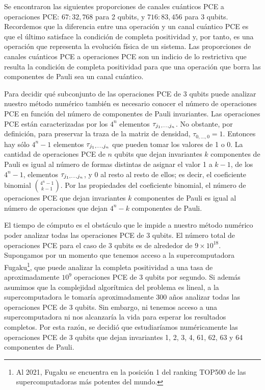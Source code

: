 Se encontraron las siguientes proporciones de canales cuánticos PCE a 
operaciones PCE: $67:32,768$ para 2 qubits, y $716:83,456$ para 
3 qubits. Recordemos que la diferencia entre una operación y un canal cuántico PCE
es que el último satisface la condición de completa positividad y, por tanto, 
es una operación que representa la evolución física de un sistema. 
Las proporciones de canales cuánticos PCE a operaciones PCE son un indicio 
de lo restrictiva que resulta la condición de completa positividad para que 
una operación que borra las componentes de Pauli sea un canal cuántico.

Para decidir qué subconjunto de las operaciones PCE de 3 qubits puede analizar
nuestro método numérico también es necesario conocer el número 
de operaciones PCE en función del número de componentes 
de Pauli invariantes. Las operaciones PCE están caracterizadas 
por los $4^n$ elementos $\tau_{j_1,\ldots ,j_n}$. No obstante, por definición, 
para preservar la traza de la matriz de densidad, $\tau_{0,\ldots,0}=1$.
Entonces hay sólo $4^n-1$ elementos $\tau_{j_1,\ldots ,j_n}$ que pueden tomar los valores de 1 o 0.
La cantidad de operaciones PCE de $n$ qubits que dejan invariantes $k$ componentes 
de Pauli es igual al número de formas distintas de asignar el valor 1
a $k-1$, de los $4^n-1$, elementos $\tau_{j_1,\ldots ,j_n}$, y 0 al resto al resto de ellos; 
es decir, el coeficiente binomial $\binom{4^n-1}{k-1}$. Por las propiedades
del coeficiente binomial, el número de operaciones PCE que dejan invariantes 
$k$ componentes de Pauli es igual al número de operaciones que dejan $4^n-k$
componentes de Pauli. 

El tiempo de cómputo es el obstáculo que le impide a nuestro método numérico
poder analizar todas las operaciones PCE de 3 qubits. 
El número total de operaciones PCE para el caso 
de 3 qubits es de alrededor de $9\times10^{18}$. Supongamos por un momento
que tenemos acceso a la supercomputadora Fugaku\footnote{Al 2021, 
Fugaku se encuentra en la posición 1 del ranking TOP500 de las supercomputadoras
más potentes del mundo.},
que puede analizar la completa positividad a una tasa de
aproximadamente $10^9$ operaciones PCE de 
3 qubits por segundo. Si además asumimos que la complejidad 
algorítmica del problema es lineal, a la supercomputadora le tomaría
aproximadamente 300 años analizar todas las operaciones PCE de 3 qubits.
Sin embargo, ni tenemos acceso a una supercomputadora
ni nos alcanzaría la vida para esperar los resultados completos. 
Por esta razón, se decidió que estudiaríamos numéricamente 
las operaciones PCE de 3 qubits que dejan invariantes 1, 2, 3, 4, 61, 62, 63 y 64
componentes de Pauli.


